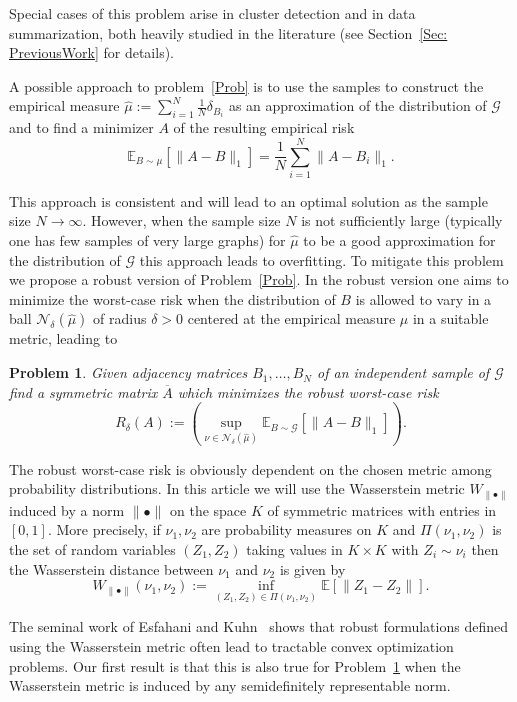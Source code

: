 \documentclass[12pt]{amsart}
\newtheorem{problem}[lemma]{Problem}
\theoremstyle{remark}
\newcommand{\EE}{\mathbb{E}}
\newcommand{\grG}{{\mathcal{G}}}
\begin{document}
Special cases of this problem arise in cluster detection and in data summarization, both heavily studied in the literature (see Section~\ref{Sec: PreviousWork} for details).

A possible approach to problem~\ref{Prob} is to use the samples to construct the empirical measure $\hat{\mu}:=\sum_{i=1}^N \frac{1}{N}\delta_{B_i}$ as an approximation of the distribution of $\grG$ and to find a minimizer $A$ of the resulting empirical risk
\[ \EE_{B\sim \mu}[\|A-B\|_1]=\frac{1}{N}\sum_{i=1}^N \|A-B_i\|_1.\]

This approach is consistent and will lead to an optimal solution as the sample size $N\rightarrow \infty$. However, when the sample size $N$ is not sufficiently large (typically one has few samples of very large graphs) for $\hat{\mu}$ to be a good approximation for the distribution of $\grG$ this approach leads to overfitting. To mitigate this problem we propose a robust version of Problem~\ref{Prob}. In the robust version one aims to minimize the worst-case risk when the distribution of $B$ is allowed to vary in a ball $\mathcal{N}_{\delta}(\hat{\mu})$ of radius $\delta>0$ centered at the empirical measure $\hat{\mu}$ in a suitable metric, leading to 

\begin{problem}\label{ProbRobusto} Given adjacency matrices $B_1,\dots, B_N$ of an independent sample of $\grG$ find a symmetric matrix $\overline{A}$ which minimizes the robust worst-case risk 
\[R_{\delta}(A):=\left(\sup_{\nu\in \mathcal{N}_{\delta}(\hat{\mu})} \EE_{B\sim \grG}[\|A-B\|_1]\right).\] 
\end{problem}
The robust worst-case risk is obviously dependent on the chosen metric among probability distributions. In this article we will use the Wasserstein metric $W_{\|\bullet\|}$ induced by a norm $\|\bullet\|$ on the space $K$ of symmetric matrices with entries in $[0,1]$. More precisely, if $\nu_1,\nu_2$ are probability measures on $K$ and $\Pi(\nu_1,\nu_2)$ is the set of random variables $(Z_1,Z_2)$ taking values in $K\times K$  with $Z_i\sim \nu_i$ then the Wasserstein distance between $\nu_1$ and $\nu_2$ is given by 
\[ W_{\|\bullet\|}(\nu_1,\nu_2):=\inf_{(Z_1,Z_2)\in \Pi(\nu_1,\nu_2)} \EE[\|Z_1-Z_2\|].\]

The seminal work of Esfahani and Kuhn~\cite{EsfahaniKuhn} shows that robust formulations defined using the Wasserstein metric often lead to tractable convex optimization problems. Our first result is that this is also true for Problem~\ref{ProbRobusto} when the Wasserstein metric is induced by any semidefinitely representable norm.
\end{document}
